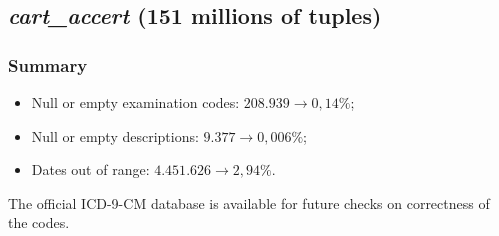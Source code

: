 \subsection{\textit{cart\_accert} (151 millions of tuples)}
\subsubsection{Summary}
\begin{itemize}
	\item Null or empty examination codes: $208.939 \rightarrow 0,14\%$;
	\item Null or empty descriptions: $9.377 \rightarrow 0,006\%$;
	\item Dates out of range: $4.451.626 \rightarrow 2,94\%$.
\end{itemize}

The official ICD-9-CM database is available for future checks on correctness of the codes.

